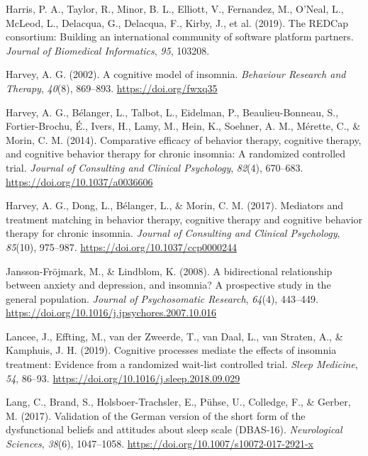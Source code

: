 \documentclass[
  ,doc,11pt, twoside,floatsintext]{apa6}
\newlength{\cslhangindent}
\newlength{\cslentryspacingunit} %
\newenvironment{CSLReferences}[2] %
 {%
  \setlength{\parindent}{0pt}
  \ifodd #1
  \let\oldpar\par
  \def\par{\hangindent=\cslhangindent\oldpar}
  \fi
  \setlength{\parskip}{#2\cslentryspacingunit}
 }%
 {}
\begin{document}
\begin{CSLReferences}{1}{0}
\leavevmode{}%
Harris, P. A., Taylor, R., Minor, B. L., Elliott, V., Fernandez, M., O'Neal, L., McLeod, L., Delacqua, G., Delacqua, F., Kirby, J., et al. (2019). The REDCap consortium: Building an international community of software platform partners. \emph{Journal of Biomedical Informatics}, \emph{95}, 103208.

\leavevmode{}%
Harvey, A. G. (2002). A cognitive model of insomnia. \emph{Behaviour Research and Therapy}, \emph{40}(8), 869--893. \url{https://doi.org/fwxq35}

\leavevmode{}%
Harvey, A. G., Bélanger, L., Talbot, L., Eidelman, P., Beaulieu-Bonneau, S., Fortier-Brochu, É., Ivers, H., Lamy, M., Hein, K., Soehner, A. M., Mérette, C., \& Morin, C. M. (2014). Comparative efficacy of behavior therapy, cognitive therapy, and cognitive behavior therapy for chronic insomnia: A randomized controlled trial. \emph{Journal of Consulting and Clinical Psychology}, \emph{82}(4), 670--683. \url{https://doi.org/10.1037/a0036606}

\leavevmode{}%
Harvey, A. G., Dong, L., Bélanger, L., \& Morin, C. M. (2017). Mediators and treatment matching in behavior therapy, cognitive therapy and cognitive behavior therapy for chronic insomnia. \emph{Journal of Consulting and Clinical Psychology}, \emph{85}(10), 975--987. \url{https://doi.org/10.1037/ccp0000244}

\leavevmode{}%
Jansson-Fröjmark, M., \& Lindblom, K. (2008). A bidirectional relationship between anxiety and depression, and insomnia? {A} prospective study in the general population. \emph{Journal of Psychosomatic Research}, \emph{64}(4), 443--449. \url{https://doi.org/10.1016/j.jpsychores.2007.10.016}

\leavevmode{}%
Lancee, J., Effting, M., van der Zweerde, T., van Daal, L., van Straten, A., \& Kamphuis, J. H. (2019). Cognitive processes mediate the effects of insomnia treatment: Evidence from a randomized wait-list controlled trial. \emph{Sleep Medicine}, \emph{54}, 86--93. \url{https://doi.org/10.1016/j.sleep.2018.09.029}

\leavevmode{}%
Lang, C., Brand, S., Holsboer-Trachsler, E., Pühse, U., Colledge, F., \& Gerber, M. (2017). Validation of the {German} version of the short form of the dysfunctional beliefs and attitudes about sleep scale ({DBAS-16}). \emph{Neurological Sciences}, \emph{38}(6), 1047--1058. \url{https://doi.org/10.1007/s10072-017-2921-x}


\end{CSLReferences}
\end{document}

